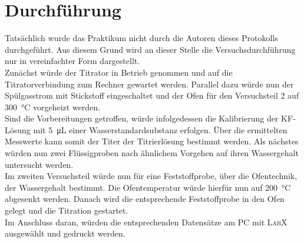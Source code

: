 \section{Durchführung}
\label{sec:durchfuerung}
Tatsächlich wurde das Praktikum nicht durch die Autoren dieses Protokolls durchgeführt. Aus diesem Grund wird an dieser Stelle die Versuchsdurchführung nur in vereinfachter Form dargestellt.\\
Zunächst würde der Titrator in Betrieb genommen und auf die Titratorverbindung zum Rechner gewartet werden. Parallel dazu würde nun der Spülgasstrom mit Stickstoff eingeschaltet und der Ofen für den Versuchsteil 2 auf \SI{300}{\celsius} vorgeheizt werden. \\
Sind die Vorbereitungen getroffen, würde infolgedessen die Kalibrierung der KF-Lösung mit \SI{5}{\micro \liter} einer Wasserstandardsubstanz erfolgen. Über die ermittelten Messwerte kann somit der Titer der Titrierlösung bestimmt werden.
Als nächstes würden nun zwei Flüssigproben nach ähnlichem Vorgehen auf ihren Wassergehalt untersucht werden.\\
Im zweiten Versuchsteil würde nun für eine Feststoffprobe, über die Ofentechnik, der Wassergehalt bestimmt. Die Ofentemperatur würde hierfür nun auf \SI{200}{\celsius} abgesenkt werden. Danach wird die entsprechende Feststoffprobe in den Ofen gelegt und die Titration gestartet.\\
Im Anschluss daran, würden die entsprechenden Datensätze am PC mit \textsc{LabX} ausgewählt und gedruckt werden.